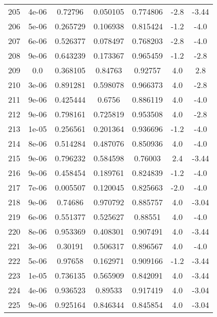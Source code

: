 \begin{table}
\begin{tabular}{c|c|c|c|c|c|c}
205 & 4e-06 & 0.72796 & 0.050105 & 0.774806 & -2.8 & -3.44\\
206 & 5e-06 & 0.265729 & 0.106938 & 0.815424 & -1.2 & -4.0\\
207 & 6e-06 & 0.526377 & 0.078497 & 0.768203 & -2.8 & -4.0\\
208 & 9e-06 & 0.643239 & 0.173367 & 0.965459 & -1.2 & -2.8\\
209 & 0.0 & 0.368105 & 0.84763 & 0.92757 & 4.0 & 2.8\\
210 & 3e-06 & 0.891281 & 0.598078 & 0.966373 & 4.0 & -2.8\\
211 & 9e-06 & 0.425444 & 0.6756 & 0.886119 & 4.0 & -4.0\\
212 & 9e-06 & 0.798161 & 0.725819 & 0.953508 & 4.0 & -2.8\\
213 & 1e-05 & 0.256561 & 0.201364 & 0.936696 & -1.2 & -4.0\\
214 & 8e-06 & 0.514284 & 0.487076 & 0.850936 & 4.0 & -4.0\\
215 & 9e-06 & 0.796232 & 0.584598 & 0.76003 & 2.4 & -3.44\\
216 & 9e-06 & 0.458454 & 0.189761 & 0.824839 & -1.2 & -4.0\\
217 & 7e-06 & 0.005507 & 0.120045 & 0.825663 & -2.0 & -4.0\\
218 & 9e-06 & 0.74686 & 0.970792 & 0.885757 & 4.0 & -3.04\\
219 & 6e-06 & 0.551377 & 0.525627 & 0.88551 & 4.0 & -4.0\\
220 & 8e-06 & 0.953369 & 0.408301 & 0.907491 & 4.0 & -3.44\\
221 & 3e-06 & 0.30191 & 0.506317 & 0.896567 & 4.0 & -4.0\\
222 & 5e-06 & 0.97658 & 0.162971 & 0.909166 & -1.2 & -3.44\\
223 & 1e-05 & 0.736135 & 0.565909 & 0.842091 & 4.0 & -3.44\\
224 & 4e-06 & 0.936523 & 0.89533 & 0.917419 & 4.0 & -3.04\\
225 & 9e-06 & 0.925164 & 0.846344 & 0.845854 & 4.0 & -3.04\\
\end{tabular}
\end{table}
\newpage
